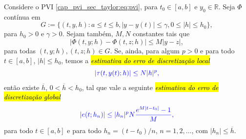 \begin{teo}\label{cap_pvi_sec_taylor:teo:conv}
  Considere o PVI \eqref{cap_pvi_sec_taylor:eq:pvi}, para $t_0\in [a, b]$ e $y_0\in\mathbb{R}$. Seja $\Phi$ contínua em
  \begin{equation}
    G := \{(t, y, h): a\leq t\leq b, |y-y(t)|\leq\gamma, 0\leq|h|\leq h_0\},
  \end{equation}
  para $h_0>0$ e $\gamma>0$. Sejam também, $M, N$ constantes tais que
  \begin{equation}
    \left|\Phi(t, y; h) - \Phi(t, z; h)\right| \leq M|y - z|,
  \end{equation}
  para todas $(t, y; h), (t, z; h)\in G$. Se, ainda, para algum $p>0$ e para todo $t\in [a, b]$, $|h|\leq h_0$, temos a \hl{\emph{estimativa do erro de discretização local}}
  \begin{equation}\color{blue}\left|\tau(t, y(t); h)\right| \leq N |h|^p,
  \end{equation}
  então existe $\overline{h}$, $0<\overline{h}<h_0$, tal que vale a seguinte \hl{\emph{estimativa do erro de discretização global}}
  \begin{equation}\color{blue}|e(t; h_n)| \leq |h_n|^pN\frac{e^{M|t-t_0|}-1}{M},
  \end{equation}
  para todo $t\in [a, b]$ e para todo $h_n = (t-t_0)/n$, $n=1, 2, \ldots$, com $|h_n|\leq \overline{h}$.
\end{teo}
